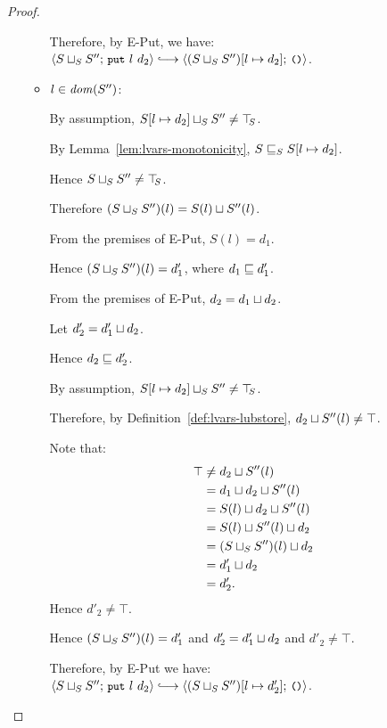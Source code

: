 \begin{proof}
\begin{itemize}
\begin{itemize}
      Therefore, by {\sc E-Put}, we have:
      $\config{\lubstore{S}{S''}}{\putexp{l}{d_2}} \parstepsto
      \config{\extSRaw{(\lubstore{S}{S''})}{l}{d_2}}{\unit}$.

    \item $l \in \mathit{dom}(S'')$:

      By assumption, $S[l \mapsto d_2] \sqcup_{S} S'' \neq \top\hspace{-0.85mm}_{S}$.

      By Lemma~\ref{lem:lvars-monotonicity},
      $S \sqsubseteq_S S[l \mapsto d_2]$.

      Hence $S \sqcup_{S} S'' \neq \top\hspace{-0.85mm}_{S}$.

      Therefore $(S \sqcup_{S} S'')(l) = S(l) \sqcup S''(l)$.

      From the premises of {\sc E-Put}, $S(l) = d_1$.
      
      Hence $(S \sqcup_{S} S'')(l) = d'_1$, where $d_1 \sqsubseteq
      d'_1$.

      From the premises of {\sc E-Put}, $d_2 = d_1 \sqcup d_2$.

      Let $d'_2 = d'_1 \sqcup d_2$.

      Hence $d_2 \sqsubseteq d'_2$.

      By assumption, $S[l \mapsto d_2] \sqcup_{S} S'' \neq \top\hspace{-0.85mm}_{S}$.

      Therefore, by Definition~\ref{def:lvars-lubstore},
      $d_2 \sqcup S''(l) \neq \top$.

      Note that:
      \begin{align*}
        \top &\neq d_2 \sqcup S''(l) \\ &=
        d_1 \sqcup d_2 \sqcup S''(l) \\ &=
        S(l) \sqcup d_2 \sqcup S''(l) \\ &=
        S(l) \sqcup S''(l) \sqcup d_2 \\ &=
        (S \sqcup_{S} S'')(l) \sqcup d_2 \\ &=
        d'_1 \sqcup d_2 \\ &= d'_2.
      \end{align*}
      Hence $d'_2 \neq \top$.

      Hence $(S \sqcup_{S} S'')(l) = d'_1$ and $d'_2 =
      d'_1 \sqcup d_2$ and $d'_2 \neq \top$.

      Therefore, by {\sc E-Put} we have:
      $\config{\lubstore{S}{S''}}{\putexp{l}{d_2}} \parstepsto
      \config{\extSRaw{(\lubstore{S}{S''})}{l}{d'_2}}{\unit}$.



\end{itemize}
\end{itemize}
\end{proof}
